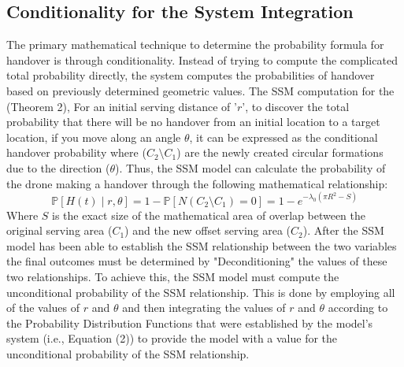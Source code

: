 \documentclass[12pt,a4paper]{article}
\begin{document}
   \subsection*{Conditionality for the System Integration} %
The primary mathematical technique to determine the probability formula for handover is through conditionality.    %
Instead of trying to compute the complicated total probability directly, the system computes the probabilities of handover based on previously determined geometric values.    %
The SSM computation for the (Theorem 2), For an initial serving distance of '$r$', to discover the total probability that there will be no handover from an initial location to a target location, if you move along an angle $\theta$, it can be expressed as the conditional handover probability where ($C_2 \setminus C_1$) are the newly created circular formations due to the direction ($\theta$).    %
   Thus, the SSM model can calculate the probability of the drone making a handover through the following mathematical relationship: %
   $$\mathbb{P}[H(t) \mid r,\theta] = 1 - \mathbb{P}[N(C_2 \setminus C_1) = 0] = 1 - e^{-\lambda_0(\pi R^2 - S)}$$ %
Where $S$ is the exact size of the mathematical area of overlap between the original serving area ($C_1$) and the new offset serving area ($C_2$).    %
After the SSM model has been able to establish the SSM relationship between the two variables the final outcomes must be determined by "Deconditioning" the values of these two relationships.    %
To achieve this, the SSM model must compute the unconditional probability of the SSM relationship.    %
This is done by employing all of the values of $r$ and $\theta$ and then integrating the values of $r$ and $\theta$ according to the Probability Distribution Functions that were established by the model’s system (i.e., Equation (2)) to provide the model with a value for the unconditional probability of the SSM relationship.    %
\end{document}
